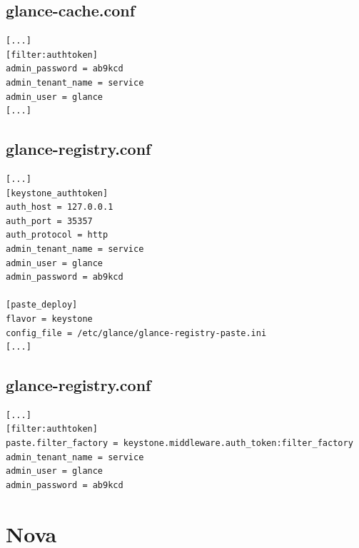 \documentclass[a4paper,oneside]{report}
\begin{document}
\subsection{glance-cache.conf}
\begin{verbatim}
[...]
[filter:authtoken]
admin_password = ab9kcd
admin_tenant_name = service
admin_user = glance
[...]
\end{verbatim}

\subsection{glance-registry.conf}
\begin{verbatim}
[...]
[keystone_authtoken]
auth_host = 127.0.0.1
auth_port = 35357
auth_protocol = http
admin_tenant_name = service
admin_user = glance
admin_password = ab9kcd

[paste_deploy]
flavor = keystone
config_file = /etc/glance/glance-registry-paste.ini
[...]
\end{verbatim}

\subsection{glance-registry.conf}
\begin{verbatim}
[...]
[filter:authtoken]
paste.filter_factory = keystone.middleware.auth_token:filter_factory
admin_tenant_name = service
admin_user = glance
admin_password = ab9kcd
\end{verbatim}

\newpage
\section{Nova} \label{conf:Nova}
\end{document}
